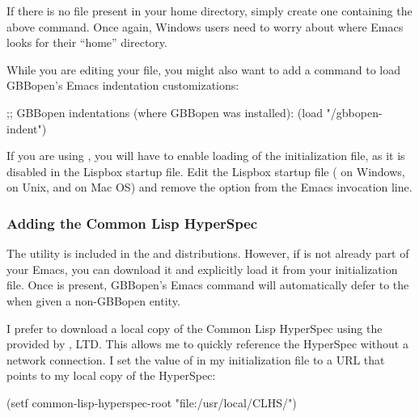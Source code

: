 \documentclass[10pt,twoside,english,pdftex]{article}
\begin{document}
If there is no  file present in your home directory, simply
create one containing the above command. Once again, Windows users need to
worry about where Emacs looks for their ``home'' directory.

While you are editing your  file, you might also want to add a
command to load GBBopen's Emacs indentation customizations:
%
\W\supp
\begin{example}
  ;; GBBopen indentations (where GBBopen was installed):
  (load "/gbbopen-indent")
\end{example}

If you are using
, you
will have to enable loading of the  initialization file, as it is
disabled in the Lispbox startup file.  Edit the Lispbox startup file
( on Windows,  on Unix, and
 on Mac OS)
and remove the  option from the Emacs invocation line.

\subsubsection*{Adding the Common Lisp HyperSpec}

The 
utility is included in the
 and
 distributions.
However, if  is not already part of your Emacs, you can
download it and explicitly load it from your  initialization
file.  Once  is present, GBBopen's 
Emacs command will automatically defer to the  when given a
non-GBBopen entity.

I prefer to download a local copy of the Common Lisp HyperSpec using the
provided by , LTD.  This allows
me to quickly reference the HyperSpec without a network connection.  I set the
value of  in my  initialization
file to a URL that points to my local copy of the HyperSpec:
%
\W\supp
\begin{example}
  (setf common-lisp-hyperspec-root "file:/usr/local/CLHS/")
\end{example}
\end{document}
